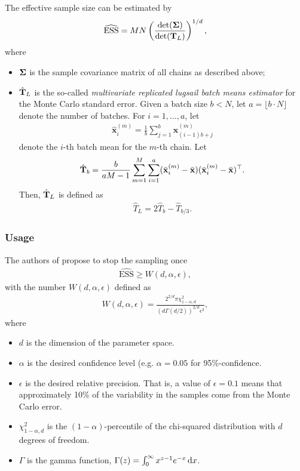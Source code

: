 \documentclass[10pt]{article}
\numberwithin{equation}{section}
\begin{document}
The effective sample size can be estimated by
\begin{align*}
\widehat {\mathrm{ESS}} = MN \left(\frac{\det(\mathbf{\Sigma})}{\det(\mathbf{T}_L)} \right)^{1/d},
\end{align*}
where
\begin{itemize}
\item $\mathbf{\Sigma}$ is the sample covariance matrix of all chains as described above;
\item $\hat{\mathbf{T}}_L$ is the so-called \emph{multivariate replicated lugsail batch means estimator} for the Monte Carlo standard error. Given a batch size $b < N$, let $a = \lfloor b \cdot N \rfloor$ denote the number of batches. For $i = 1,\ldots, a$, let
\begin{align*}
\hat{\bm x}_i^{(m)} = \frac{1}{b} \sum_{j=1}^b \bm x_{(i-1)b + j}^{(m)}
\end{align*}
denote the $i$-th batch mean for the $m$-th chain. Let
\begin{align*}
\hat{\mathbf{T}}_b = \frac{b}{aM - 1} \sum_{m=1}^M \sum_{i=1}^a (\bar{\mathbf{x}}_i^{(m)} - \bar{\mathbf{x}})(\bar{\mathbf{x}}_i^{(m)} - \bar{\mathbf{x}})^\top.
\end{align*}
Then, $\hat{\mathbf{T}}_L$ is defined as
\begin{align*}
\hat T_L = 2 \hat T_b - \hat T_{b/3}.
\end{align*}
\end{itemize}

\subsubsection*{Usage}

The authors of \cite{VatFleJon19} propose to stop the sampling once
\begin{align*}
\widehat{\mathrm{ESS}} \geq W(d, \alpha, \epsilon),
\end{align*}
with the number $W(d, \alpha, \epsilon)$ defined as 
\begin{align}
W(d, \alpha, \epsilon) = \frac{2^{2/d} \pi \chi^2_{1-\alpha,d}}{(d \Gamma(d/2))^{2/d} \epsilon^2}, \label{eq:w_d_alpha_epsilon}
\end{align}
where
\begin{itemize}
\item $d$ is the dimension of the parameter space.
\item $\alpha$ is the desired confidence level (e.g. $\alpha=0.05$ for 95\%-confidence.
\item $\epsilon$ is the desired relative precision. That is, a value of $\epsilon=0.1$ means that approximately 10\% of the variability in the samples come from the Monte Carlo error.
\item $\chi^2_{1-\alpha, d}$ is the $(1-\alpha)$-percentile of the chi-squared distribution with $d$ degrees of freedom.
\item $\Gamma$ is the gamma function, $\Gamma(z) = \int_0^\infty x^{z-1} e^{-x} \,\mathrm d x$.
\end{itemize}
\end{document}
